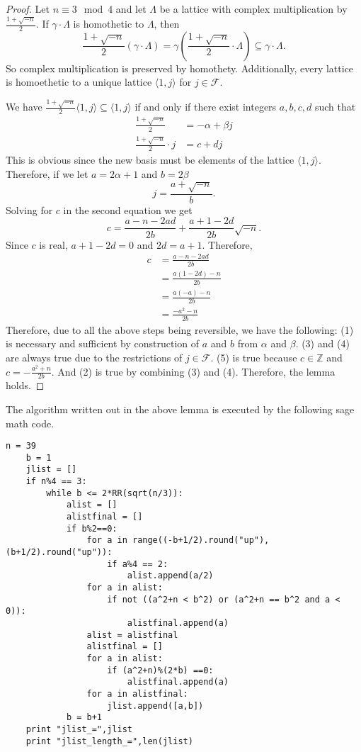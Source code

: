 \documentclass[12pt]{amsart}
\theoremstyle{definition}
\theoremstyle{remark}
\begin{document}
\begin{proof}
    Let $n\equiv 3 \mod 4$ and let $\Lambda$ be a lattice with complex multiplication by $\frac{1+\sqrt{-n}}{2}$. If $\gamma \cdot \Lambda$ is homothetic to $\Lambda$, then 
    $$\frac{1+\sqrt{-n}}{2}\left(\gamma\cdot\Lambda\right) = \gamma \left(\frac{1+\sqrt{-n}}{2}\cdot\Lambda\right) \subseteq \gamma\cdot\Lambda.$$
    So complex multiplication is preserved by homothety. Additionally, every lattice is homoethetic to a unique lattice $\langle 1,j\rangle$ for $j \in \mathcal{F}$. 
    
    We have $\frac{1+\sqrt{-n}}{2}\langle 1,j\rangle \subseteq \langle 1,j\rangle$ if and only if there exist integers $a,b,c,d$ such that
    \begin{align*}
        \frac{1+\sqrt{-n}}{2} &= -\alpha + \beta j\\
        \frac{1+\sqrt{-n}}{2}\cdot j &= c + dj
    \end{align*}
    This is obvious since the new basis must be elements of the lattice $\langle 1,j\rangle$. Therefore, if we let $a = 2\alpha +1$ and $b = 2\beta$ 
    $$ j = \frac{a + \sqrt{-n}}{b}.$$
    Solving for $c$ in the second equation we get
    $$c = \frac{a-n-2ad}{2b} + \frac{a+1-2d}{2b}\sqrt{-n}.$$
    Since $c$ is real, $a+1-2d=0$ and $2d = a+1$. Therefore, 
    \begin{align*}
        c &= \frac{a-n-2ad}{2b}\\
        &= \frac{a(1-2d)-n}{2b}\\
        &= \frac{a(-a)-n}{2b}\\
        &= \frac{-a^2-n}{2b}
    \end{align*}
    Therefore, due to all the above steps being reversible, we have the following:
    (1) is necessary and sufficient by construction of $a$ and $b$ from $\alpha$ and $\beta$.
    (3) and (4) are always true due to the restrictions of $j\in\mathcal{F}$. 
    (5) is true because $c\in\mathbb{Z}$ and $c=-\frac{a^2+n}{2b}$. And (2) is true by combining (3) and (4). Therefore, the lemma holds.
\end{proof}

The algorithm written out in the above lemma is executed by the following sage math code.
            \begin{lstlisting}[style = Python]
    n = 39
    b = 1
    jlist = []
    if n%4 == 3:
        while b <= 2*RR(sqrt(n/3)):
            alist = []
            alistfinal = []
            if b%2==0:
                for a in range((-b+1/2).round("up"), (b+1/2).round("up")):
                    if a%4 == 2:
                        alist.append(a/2)
                for a in alist:
                    if not ((a^2+n < b^2) or (a^2+n == b^2 and a < 0)):
                        alistfinal.append(a)
                alist = alistfinal
                alistfinal = []
                for a in alist:
                    if (a^2+n)%(2*b) ==0:
                        alistfinal.append(a)
                for a in alistfinal:
                    jlist.append([a,b])
            b = b+1
    print "jlist_=",jlist
    print "jlist_length_=",len(jlist)
        \end{lstlisting}
\end{document}
